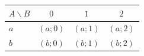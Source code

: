 \begingroup\renewcommand{\arraystretch}{1.35}
\begin{tabular}{@{}lccc@{}}\toprule
$A\backslash B$ & $0$ & $1$ & $2$\\\midrule
$a$ & $(a;0)$ & $(a;1)$ & $(a;2)$\\
$b$ & $(b;0)$ & $(b;1)$ & $(b;2)$\\
\bottomrule\end{tabular}\endgroup

\par\smallskip{}
